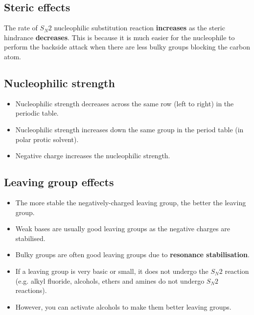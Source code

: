 \documentclass[11pt]{article}
\begin{document}
\subsection{Steric effects}
\label{sec:org72f9d6d}
The rate of \(S_N 2\) nucleophilic substitution reaction \textbf{increases} as the steric hindrance \textbf{decreases}. This is because it is much easier for the nucleophile to perform the backside attack when there are less bulky groups blocking the carbon atom.
\subsection{Nucleophilic strength}
\label{sec:orgb305146}
\begin{itemize}
\item Nucleophilic strength decreases across the same row (left to right) in the periodic table.
\item Nucleophilic strength increases down the same group in the period table (in polar protic solvent).
\item Negative charge increases the nucleophilic strength.
\end{itemize}
\subsection{Leaving group effects}
\label{sec:orgd742ab4}
\begin{itemize}
\item The more stable the negatively-charged leaving group, the better the leaving group.
\item Weak bases are usually good leaving groups as the negative charges are stabilised.
\item Bulky groups are often good leaving groups due to \textbf{resonance stabilisation}.
\item If a leaving group is very basic or small, it does not undergo the \(S_N 2\) reaction (e.g. alkyl fluoride, alcohols, ethers and amines do not undergo \(S_N 2\) reactions).
\item However, you can activate alcohols to make them better leaving groups.
\end{itemize}
\end{document}
